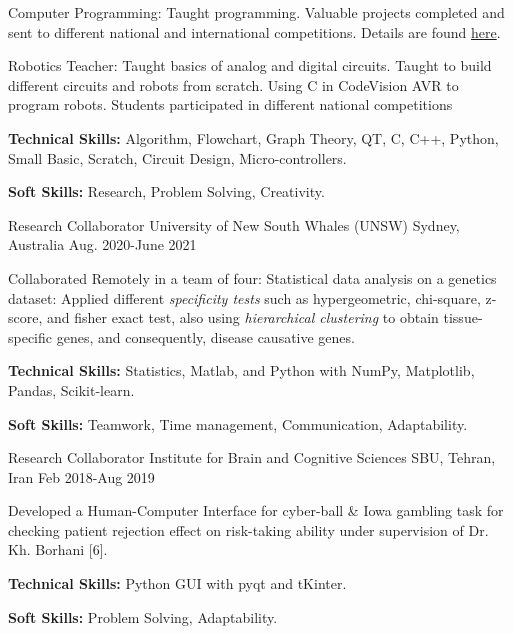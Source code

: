 \begin{cventries}
{\begin{cvitems}
        \item{Computer Programming:}
          {Taught programming. Valuable projects completed and sent to different national and international competitions. Details are found \href{https://sites.google.com/view/steacher/farzanegan-1-high-school/junior-programming}{here}.}
        \item{Robotics Teacher:}
          {Taught basics of analog and digital circuits. Taught to build different circuits and robots from scratch. Using C in CodeVision AVR to program robots. Students participated in different national competitions}
        \item {\textbf{Technical Skills:} Algorithm, Flowchart, Graph Theory, QT, C, C++, Python, Small Basic, Scratch, Circuit Design, Micro-controllers.}
        \item {\textbf{Soft Skills:} Research, Problem Solving, Creativity.}
      \end{cvitems}
    }
    
  \cventry
{Research Collaborator}  %
    {University of New South Whales (UNSW)} %
    {Sydney, Australia} %
    {Aug. 2020-June 2021} %
    {
      \begin{cvitems} %
        \item{Collaborated Remotely in a team of four: Statistical data analysis on a genetics dataset: Applied different \textit{specificity tests} such as hypergeometric, chi-square, z-score, and fisher exact test, also using \textit{hierarchical clustering} to obtain tissue-specific genes, and consequently, disease causative genes.}
        \item {\textbf{Technical Skills:} Statistics, Matlab, and Python with NumPy, Matplotlib, Pandas, Scikit-learn.}
        \item {\textbf{Soft Skills:} Teamwork, Time management, Communication, Adaptability.}
      \end{cvitems}
    }
 
  \cventry
    {Research Collaborator}  %
    {Institute for Brain and Cognitive Sciences} %
    {SBU, Tehran, Iran} %
    {Feb 2018-Aug 2019} %
    {
      \begin{cvitems} %
        \item{Developed a Human-Computer Interface for cyber-ball \& Iowa gambling task for checking patient rejection effect on risk-taking ability under supervision of Dr. Kh. Borhani [6].}
        \item {\textbf{Technical Skills:} Python GUI with pyqt and tKinter.}
        \item {\textbf{Soft Skills:} Problem Solving, Adaptability.}
      \end{cvitems}
    }


\end{cventries}
